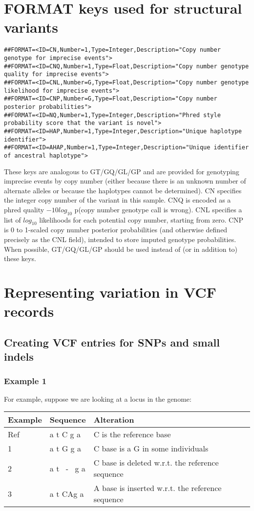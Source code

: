 \documentclass[8pt]{article}
\begin{document}
\section{FORMAT keys used for structural variants}
\label{sv-format-keys}
\footnotesize
\begin{verbatim}
##FORMAT=<ID=CN,Number=1,Type=Integer,Description="Copy number genotype for imprecise events">
##FORMAT=<ID=CNQ,Number=1,Type=Float,Description="Copy number genotype quality for imprecise events">
##FORMAT=<ID=CNL,Number=G,Type=Float,Description="Copy number genotype likelihood for imprecise events">
##FORMAT=<ID=CNP,Number=G,Type=Float,Description="Copy number posterior probabilities">
##FORMAT=<ID=NQ,Number=1,Type=Integer,Description="Phred style probability score that the variant is novel">
##FORMAT=<ID=HAP,Number=1,Type=Integer,Description="Unique haplotype identifier">
##FORMAT=<ID=AHAP,Number=1,Type=Integer,Description="Unique identifier of ancestral haplotype">
\end{verbatim}
\normalsize
These keys are analogous to GT/GQ/GL/GP and are provided for genotyping imprecise events by copy number (either because there is an unknown number of alternate alleles or because the haplotypes cannot be determined).
CN specifies the integer copy number of the variant in this sample.
CNQ is encoded as a phred quality $-10log_{10}$ p(copy number genotype call is wrong).
CNL specifies a list of $log_{10}$ likelihoods for each potential copy number, starting from zero.
CNP is 0 to 1-scaled copy number posterior probabilities (and otherwise defined precisely as the CNL field), intended to store imputed genotype probabilities.
When possible, GT/GQ/GL/GP should be used instead of (or in addition to) these keys.

\section{Representing variation in VCF records}
\subsection{Creating VCF entries for SNPs and small indels}
\subsubsection{Example 1}
For example, suppose we are looking at a locus in the genome:

\vspace{0.3cm}
\begin{tabular}{ | l | l | l | }
\hline
Example & Sequence & Alteration \\ \hline
Ref & a t C g a & C is the reference base \\ \hline
1   & a t G g a & C base is a G in some individuals \\ \hline
2   & a t \ - \ g a & C base is deleted w.r.t. the reference sequence\\ \hline
3   & a t CAg a & A base is inserted w.r.t. the reference sequence \\ \hline
\end{tabular}
\vspace{0.3cm}
\end{document}

